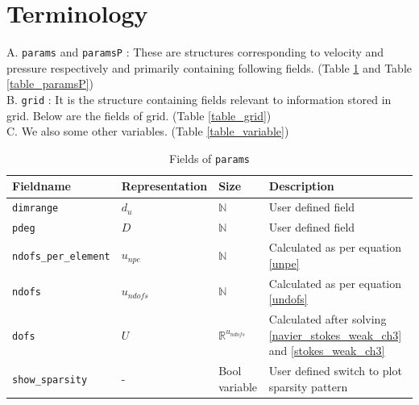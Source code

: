\documentclass[a4paper]{book}
\begin{document}
\section{Terminology}

A. \verb|params| and \verb|paramsP| : These are structures corresponding to velocity and pressure respectively and primarily containing following fields. (Table \ref{table_params} and Table \ref{table_paramsP})\\

B. \verb|grid| : It is the structure containing fields relevant to information stored in grid. Below are the fields of grid. (Table \ref{table_grid})\\

C. We also some other variables. (Table \ref{table_variable})\\

\begin{table}
\cprotect\caption{Fields of \verb|params|}
\label{table_params}
\begin{center}
\begin{tabular}{| p{}| p{} |  p{} | p{}|} 
\hline
\textbf{Fieldname} & \textbf{Representation} & \textbf{Size} & \textbf{Description}\\
\hline
\verb|dimrange| & $d_u$ & $\mathbb{N}$ & User defined field\\
\hline
\verb|pdeg| & $D$ & $\mathbb{N}$ & User defined field\\
\hline
\verb|ndofs_per_element| & $u_{npe}$ & $\mathbb{N}$ & Calculated as per equation \ref{unpe}\\
\hline
\verb|ndofs| & $u_{ndofs}$ & $\mathbb{N}$ & Calculated as per equation \ref{undofs}\\
\hline
\verb|dofs| & $U$ & $\mathbb{R}^{u_{ndofs}}$ & Calculated after solving \ref{navier_stokes_weak_ch3} and \ref{stokes_weak_ch3}\\
\hline
\verb|show_sparsity| & - & Bool variable & User defined switch to plot sparsity pattern\\
\hline
\end{tabular}
\end{center}
\end{table}
\end{document}
